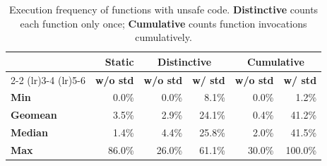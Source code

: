 \begin{table}[tb]
    \centering
    \caption{Execution frequency of functions with unsafe code.
    {\bf Distinctive} counts each function only once;
    {\bf Cumulative} counts function invocations cumulatively.}
    \label{table:unsafe_function}
    \begin{tabular}{@{}l|r|rr|rr@{}}
    \toprule
    & \textbf{Static} & \multicolumn{2}{c|}{\textbf{Distinctive}} & \multicolumn{2}{c}{\textbf{Cumulative}} \\
    \cmidrule(lr){2-2} \cmidrule(lr){3-4} \cmidrule(lr){5-6}
    \textbf{ } & \textbf{w/o std} & \textbf{w/o std} & \textbf{w/ std} & \textbf{w/o std} & \textbf{w/ std} \\
    \midrule
    \textbf{Min} & 0.0\% & 0.0\% & 8.1\% & 0.0\% & 1.2\% \\
    \textbf{Geomean} & 3.5\% & 2.9\% & 24.1\% & 0.4\% & 41.2\% \\
    \textbf{Median} & 1.4\% & 4.4\% & 25.8\% & 2.0\% & 41.5\% \\
    \textbf{Max} & 86.0\% & 26.0\% & 61.1\% & 30.0\% & 100.0\% \\
    \bottomrule
    \end{tabular}
\end{table}

